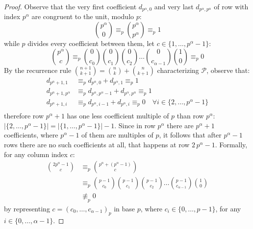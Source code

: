 \begin{proof}
  Observe that the very first coefficient $d_{p^{\alpha}, 0}$ and very last $d_{p^{\alpha}, p^{\alpha}}$ of row
  with index $p^{\alpha}$ are congruent to the unit, modulo $p$:
  \begin{displaymath}
    {{p^{\alpha}} \choose {0}} \equiv_{p}{{p^{\alpha}} \choose {p^{\alpha}}} \equiv_{p} 1
  \end{displaymath}
  while $p$ divides every coefficient between them, let
  $c\in\lbrace1,\ldots, p^{\alpha}-1 \rbrace$:
  \begin{displaymath}
    {{p^{\alpha}} \choose {c}} \equiv_{p} {{0} \choose {c_0}} {{0} \choose {c_1}}{{0} \choose {c_2}} \ldots 
    {{0} \choose {c_{{\alpha}-1}}}{{1} \choose {0}} \equiv_{p} 0
  \end{displaymath}
  By the recurrence rule ${{n+1}\choose {k+1}} = {{n} \choose {k}} + {{n}\choose{ k+1}}$
  characterizing $\mathcal{P}$, observe that:
  \begin{displaymath}
    \begin{split}
      d_{p^{\alpha}+1, 1} &\equiv_{p} d_{p^{\alpha}, 0} + d_{p^{\alpha}, 1}\equiv_{p} 1 \\
      d_{p^{\alpha}+1, p^{\alpha}} &\equiv_{p} d_{p^{\alpha}, p^{\alpha}-1} + d_{p^{\alpha}, p^{\alpha}}\equiv_{p} 1 \\
      d_{p^{\alpha}+1, i} &\equiv_{p} d_{p^{\alpha}, i-1} + d_{p^{\alpha}, i}\equiv_{p} 0 \quad \forall i \in \lbrace 2, \ldots, p^{\alpha} -1\rbrace \\
    \end{split}
  \end{displaymath}
  therefore row $p^{\alpha} + 1$ has one less coefficient multiple of $p$ 
  than row $p^{\alpha}$: $\left|\lbrace2,\ldots, p^{\alpha}-1 \rbrace\right|=
    \left|\lbrace1,\ldots, p^{\alpha}-1 \rbrace\right|-1$. 
    Since in row $p^{\alpha}$ there are $p^{\alpha}+1$ coefficients, where
  $p^{\alpha}-1$ of them are multiples of $p$, it follows that after $p^{\alpha}-1$ 
  rows there are no such coefficients at all, that happens at row $2\,p^{\alpha} -1$. 
  Formally, for any column index $c$:
  \begin{displaymath}
    \begin{split}
      {{2p^{\alpha} - 1} \choose {c}} &\equiv_{p} {{p^{\alpha} +(p^{\alpha}- 1)} \choose {c}} \\
      &\equiv_{p} {{p-1} \choose {c_0}} {{p-1} \choose {c_1}}{{p-1} \choose {c_2}} \ldots 
      {{p-1} \choose {c_{{\alpha}-1}}}{{1} \choose {0}} \\
      &\not\equiv_{p} 0
    \end{split}
  \end{displaymath}
  by representing $c=(c_{0}, \ldots,c_{\alpha-1})_{p}$ in base $p$, where
  $c_i \in \lbrace 0, \ldots, p-1 \rbrace$, for any $i\in\lbrace0,\ldots,\alpha-1\rbrace$.


\end{proof}
